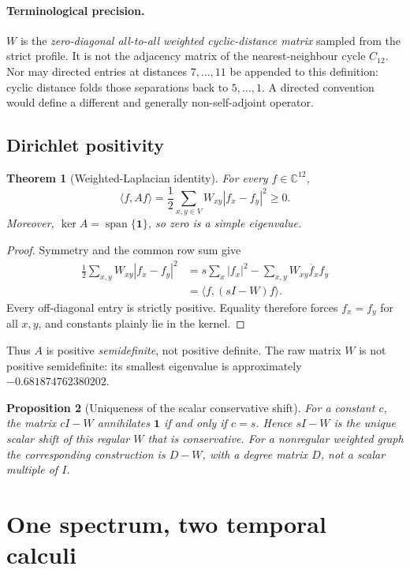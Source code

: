\documentclass[11pt,a4paper]{article}
\newtheorem{theorem}{Theorem}[section]
\newtheorem{proposition}[theorem]{Proposition}
\theoremstyle{definition}
\theoremstyle{remark}
\newcommand{\C}{\mathbb C}
\newcommand{\one}{\bm 1}
\begin{document}
\paragraph{Terminological precision.}
$W$ is the \emph{zero-diagonal all-to-all weighted cyclic-distance matrix} sampled from the strict profile. It is not the adjacency matrix of the nearest-neighbour cycle $C_{12}$. Nor may directed entries at distances $7,\ldots,11$ be appended to this definition: cyclic distance folds those separations back to $5,\ldots,1$. A directed convention would define a different and generally non-self-adjoint operator.

\subsection{Dirichlet positivity}

\begin{theorem}[Weighted-Laplacian identity]\label{thm:dirichlet}
For every $f\in\C^{12}$,
\[
 \langle f,Af\rangle
 =\frac12\sum_{x,y\in V}W_{xy}|f_x-f_y|^2\ge0.
\]
Moreover, $\ker A=\operatorname{span}\{\one\}$, so zero is a simple eigenvalue.
\end{theorem}

\begin{proof}
Symmetry and the common row sum give
\begin{align*}
\frac12\sum_{x,y}W_{xy}|f_x-f_y|^2
&=s\sum_x|f_x|^2-\sum_{x,y}W_{xy}\overline f_xf_y\\
&=\langle f,(sI-W)f\rangle.
\end{align*}
Every off-diagonal entry is strictly positive. Equality therefore forces $f_x=f_y$ for all $x,y$, and constants plainly lie in the kernel.
\end{proof}

Thus $A$ is positive \emph{semidefinite}, not positive definite. The raw matrix $W$ is not positive semidefinite: its smallest eigenvalue is approximately $-0.681874762380202$.

\begin{proposition}[Uniqueness of the scalar conservative shift]
For a constant $c$, the matrix $cI-W$ annihilates $\one$ if and only if $c=s$. Hence $sI-W$ is the unique scalar shift of this regular $W$ that is conservative. For a nonregular weighted graph the corresponding construction is $D-W$, with a degree matrix $D$, not a scalar multiple of $I$.
\end{proposition}

\section{One spectrum, two temporal calculi}
\end{document}

